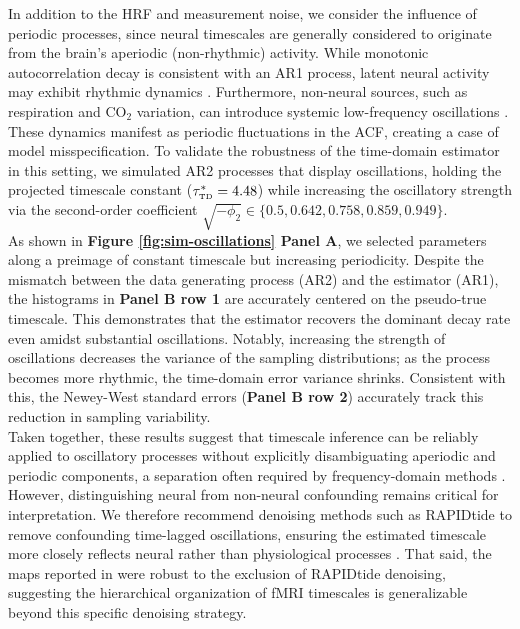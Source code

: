 \documentclass[docs/main.tex]{subfiles}
\begin{document}
In addition to the HRF and measurement noise, we consider the influence of periodic processes, since neural timescales are generally considered to originate from the brain's aperiodic (non-rhythmic) activity. While monotonic autocorrelation decay is consistent with an AR1 process, latent neural activity may exhibit rhythmic dynamics \citep{he_temporal_2010, he_scale-free_2011}. Furthermore, non-neural sources, such as respiration and $\text{CO}_2$ variation, can introduce systemic low-frequency oscillations \citep{tong_low_2019, korponay_brain-wide_2024}. These dynamics manifest as periodic fluctuations in the ACF, creating a case of model misspecification. To validate the robustness of the time-domain estimator in this setting, we simulated AR2 processes that display oscillations, holding the projected timescale constant ($\tau_{\scriptscriptstyle\text{TD}}^* = 4.48$) while increasing the oscillatory strength via the second-order coefficient $\sqrt{-\phi_2} \in \{0.5, 0.642, 0.758, 0.859, 0.949\}$.\\

As shown in \textbf{Figure \ref{fig:sim-oscillations} Panel A}, we selected parameters along a preimage of constant timescale but increasing periodicity. Despite the mismatch between the data generating process (AR2) and the estimator (AR1), the histograms in \textbf{Panel B row 1} are accurately centered on the pseudo-true timescale. This demonstrates that the estimator recovers the dominant decay rate even amidst substantial oscillations. Notably, increasing the strength of oscillations decreases the variance of the sampling distributions; as the process becomes more rhythmic, the time-domain error variance shrinks. Consistent with this, the Newey-West standard errors (\textbf{Panel B row 2}) accurately track this reduction in sampling variability.\\

Taken together, these results suggest that timescale inference can be reliably applied to oscillatory processes without explicitly disambiguating aperiodic and periodic components, a separation often required by frequency-domain methods \citep{donoghue_parameterizing_2020, gao_neuronal_2020}. However, distinguishing neural from non-neural confounding remains critical for interpretation. We therefore recommend denoising methods such as RAPIDtide to remove confounding time-lagged oscillations, ensuring the estimated timescale more closely reflects neural rather than physiological processes \citep{frederick_rapidtide_2025}. That said, the maps reported in  were robust to the exclusion of RAPIDtide denoising, suggesting the hierarchical organization of fMRI timescales is generalizable beyond this specific denoising strategy.
\end{document}
